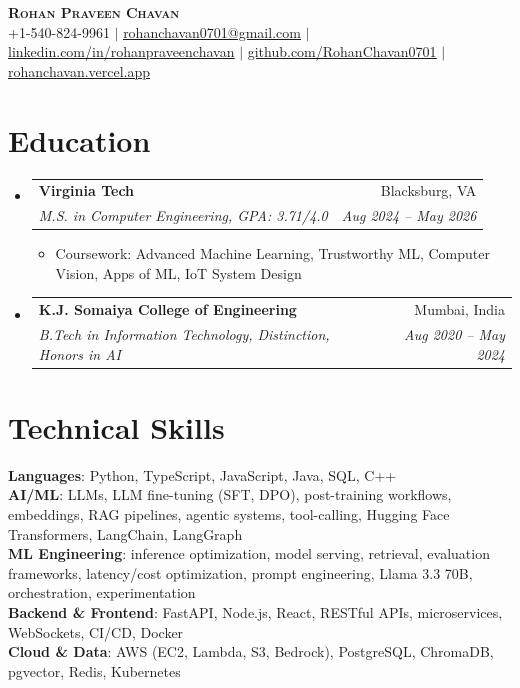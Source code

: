 \documentclass[letterpaper,10pt]{article}
\makeatletter
\newcommand{\resumeItem}[1]{\item\small{#1 \vspace{-2.5pt}}}
\newcommand{\resumeSubheading}[4]{
  \vspace{-2pt}\item
    \begin{tabular*}{0.97\textwidth}[t]{l@{\extracolsep{\fill}}r}
      \textbf{#1} & #2 \\
      \textit{\small#3} & \textit{\small #4} \\
    \end{tabular*}\vspace{-7pt}
}
\newcommand{\resumeSubHeadingListStart}{\begin{itemize}[leftmargin=0.15in, label={}]}
\newcommand{\resumeSubHeadingListEnd}{\end{itemize}}
\newcommand{\resumeItemListStart}{\begin{itemize}}
\newcommand{\resumeItemListEnd}{\end{itemize}\vspace{-5pt}}
\makeatother
\begin{document}
\begin{center}
    \textbf{\Huge \scshape Rohan Praveen Chavan} \\ \vspace{2pt}
    \small +1-540-824-9961 $|$
    \href{mailto:rohanchavan0701@gmail.com}{\underline{rohanchavan0701@gmail.com}} $|$
    \href{https://linkedin.com/in/rohanpraveenchavan}{\underline{linkedin.com/in/rohanpraveenchavan}} $|$
    \href{https://github.com/RohanChavan0701}{\underline{github.com/RohanChavan0701}} $|$
    \href{https://rohanchavan.vercel.app}{\underline{rohanchavan.vercel.app}}
\end{center}

\section{Education}
\resumeSubHeadingListStart
    \resumeSubheading
      {Virginia Tech}{Blacksburg, VA}
      {M.S. in Computer Engineering, GPA: 3.71/4.0}{Aug 2024 -- May 2026}
      \resumeItemListStart
        \resumeItem{Coursework: Advanced Machine Learning, Trustworthy ML, Computer Vision, Apps of ML, IoT System Design}
      \resumeItemListEnd
    \resumeSubheading
      {K.J. Somaiya College of Engineering}{Mumbai, India}
      {B.Tech in Information Technology, Distinction, Honors in AI}{Aug 2020 -- May 2024}
\resumeSubHeadingListEnd

\section{Technical Skills}
\begin{itemize}[leftmargin=0.15in, label={}]
    \small{\item{
     \textbf{Languages}{: Python, TypeScript, JavaScript, Java, SQL, C++} \\
     \textbf{AI/ML}{: LLMs, LLM fine-tuning (SFT, DPO), post-training workflows, embeddings,
       RAG pipelines, agentic systems, tool-calling, Hugging Face Transformers, LangChain, LangGraph} \\
     \textbf{ML Engineering}{: inference optimization, model serving, retrieval, evaluation frameworks,
       latency/cost optimization, prompt engineering, Llama 3.3 70B, orchestration, experimentation} \\
     \textbf{Backend \& Frontend}{: FastAPI, Node.js, React, RESTful APIs, microservices,
       WebSockets, CI/CD, Docker} \\
     \textbf{Cloud \& Data}{: AWS (EC2, Lambda, S3, Bedrock), PostgreSQL, ChromaDB, pgvector, Redis, Kubernetes}
    }}
\end{itemize}
\end{document}
